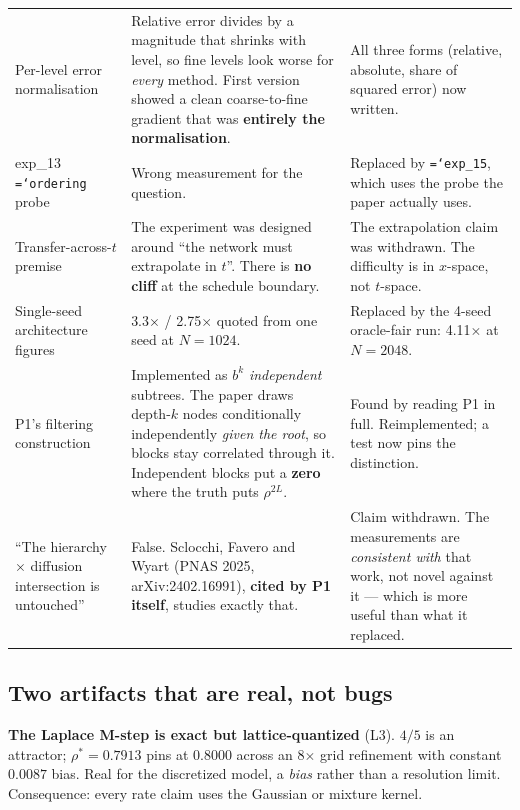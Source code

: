 \documentclass[11pt,a4paper]{article}
\newcommand{\code}[1]{\texttt{\small\hyphenchar\font=`\-\relax #1}}
\begin{document}
\begin{center}
\begin{longtable}{@{}p{4.3cm}p{6.4cm}p{4.2cm}@{}}
\addlinespace
Per-level error normalisation & Relative error divides by a magnitude that shrinks with level, so fine levels look worse for \emph{every} method. First version showed a clean coarse-to-fine gradient that was \textbf{entirely the normalisation}. & All three forms (relative, absolute, share of squared error) now written. \\
\addlinespace
exp\_13 \code{ordering} probe & Wrong measurement for the question. & Replaced by \code{exp\_15}, which uses the probe the paper actually uses. \\
\addlinespace
Transfer-across-$t$ premise & The experiment was designed around ``the network must extrapolate in $t$''. There is \textbf{no cliff} at the schedule boundary. & The extrapolation claim was withdrawn. The difficulty is in $x$-space, not $t$-space. \\
\addlinespace
Single-seed architecture figures & 3.3$\times$ / 2.75$\times$ quoted from one seed at $N=1024$. & Replaced by the 4-seed oracle-fair run: 4.11$\times$ at $N=2048$. \\
\addlinespace
P1's filtering construction & Implemented as $b^k$ \emph{independent} subtrees. The paper draws depth-$k$ nodes conditionally independently \emph{given the root}, so blocks stay correlated through it. Independent blocks put a \textbf{zero} where the truth puts $\rho^{2L}$. & Found by reading P1 in full. Reimplemented; a test now pins the distinction. \\
\addlinespace
``The hierarchy $\times$ diffusion intersection is untouched'' & False. Sclocchi, Favero and Wyart (PNAS 2025, arXiv:2402.16991), \textbf{cited by P1 itself}, studies exactly that. & Claim withdrawn. The measurements are \emph{consistent with} that work, not novel against it --- which is more useful than what it replaced. \\
\bottomrule
\end{longtable}
\end{center}

\subsection{Two artifacts that are real, not bugs}

\textbf{The Laplace M-step is exact but lattice-quantized} (L3). $4/5$ is an attractor;
$\rho^*=0.7913$ pins at $0.8000$ across an 8$\times$ grid refinement with constant $0.0087$
bias. Real for the discretized model, a \emph{bias} rather than a resolution limit.
Consequence: every rate claim uses the Gaussian or mixture kernel.
\end{document}
